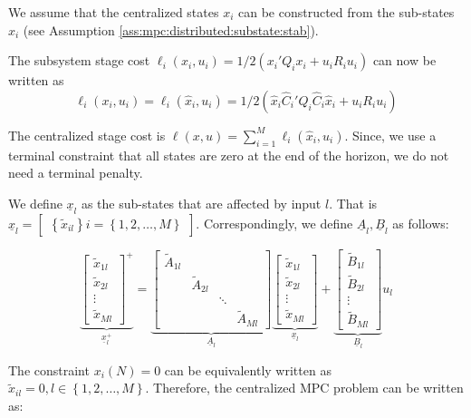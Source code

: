 \documentclass[10pt]{article}
\newcommand{\set}[1]{\left\lbrace #1 \right\rbrace}
\theoremstyle{definition}
\begin{document}
We assume that the centralized states $x_i$ can be
constructed from the sub-states $\hat{x}_{i}$ (see Assumption
\ref{ass:mpc:distributed:substate:stab}).

The subsystem stage cost $\ell_i(x_i,u_i) = 1/2(x_i'Q_ix_i + u_iR_iu_i)$
can now be written as 
\[ \ell_i(x_i,u_i) = \ell_i(\hat{x}_i,u_i) = 1/2(\hat{x}_i \hat{C}_i'Q_i\hat{C}_i \hat{x}_i +
u_iR_iu_i)\]

The centralized stage cost is $\ell(x,u) = \sum_{i=1}^{M}
\ell_i(\hat{x}_i,u_i)$. Since, we use a terminal constraint that all
states are zero at the end of the horizon, we do not need a terminal penalty.
 
We define $\underline{x}_l$ as the sub-states that are affected by
input $l$. That is $\underline{x}_l = \begin{bmatrix}\set{\tilde{x}_{il}} i =
  \set{1,2,\ldots,M}\end{bmatrix}$. Correspondingly, we define
$\underline{A}_l,\underline{B}_l$ as follows:

\begin{equation}
\underbrace{\begin{bmatrix}
\tilde{x}_{1l}\\
\tilde{x}_{2l}\\
\vdots\\
\tilde{x}_{Ml}
\end{bmatrix}^+}_{\underline{x}_l^+} =
\underbrace{\begin{bmatrix}
\tilde{A}_{1l} & & & \\
& \tilde{A}_{2l} & &  \\
& & \ddots & \\
& & & \tilde{A}_{Ml}
\end{bmatrix}
}_{\underline{A}_l}
\underbrace{\begin{bmatrix}
\tilde{x}_{1l}\\
\tilde{x}_{2l}\\
\vdots\\
\tilde{x}_{Ml}
\end{bmatrix}}_{\underline{x}_l}
+\underbrace{\begin{bmatrix}
\tilde{B}_{1l}\\
\tilde{B}_{2l}\\
\vdots\\
\tilde{B}_{Ml}
\end{bmatrix}
}_{\underline{B}_l}u_l
\label{eq:mpc:distributed:substate:Aunderline}
\end{equation}


The constraint $x_i(N)=0$ can be equivalently written as $\tilde{x}_{il}= 0, l
\in \set{1,2,\ldots,M}$. Therefore, the centralized MPC problem can be written as:
\end{document}
